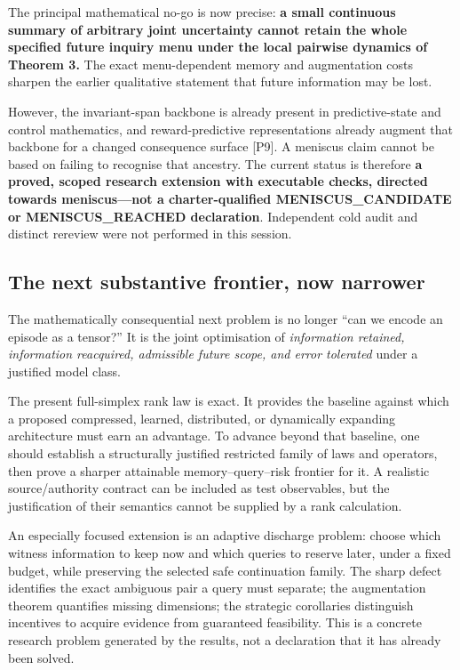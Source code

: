 \documentclass[11pt,a4paper]{article}
\begin{document}
The principal mathematical no-go is now precise: \textbf{a small
continuous summary of arbitrary joint uncertainty cannot retain the
whole specified future inquiry menu under the local pairwise dynamics of
Theorem 3.} The exact menu-dependent memory and augmentation costs
sharpen the earlier qualitative statement that future information may be
lost.

However, the invariant-span backbone is already present in
predictive-state and control mathematics, and reward-predictive
representations already augment that backbone for a changed consequence
surface {[}P9{]}. A meniscus claim cannot be based on failing to
recognise that ancestry. The current status is therefore \textbf{a
proved, scoped research extension with executable checks, directed
towards meniscus---not a charter-qualified MENISCUS\_CANDIDATE or
MENISCUS\_REACHED declaration}. Independent cold audit and distinct
rereview were not performed in this session.

\subsection{The next substantive frontier, now
narrower}\label{the-next-substantive-frontier-now-narrower}

The mathematically consequential next problem is no longer ``can we
encode an episode as a tensor?'' It is the joint optimisation of
\emph{information retained, information reacquired, admissible future
scope, and error tolerated} under a justified model class.

The present full-simplex rank law is exact. It provides the baseline
against which a proposed compressed, learned, distributed, or
dynamically expanding architecture must earn an advantage. To advance
beyond that baseline, one should establish a structurally justified
restricted family of laws and operators, then prove a sharper attainable
memory--query--risk frontier for it. A realistic source/authority
contract can be included as test observables, but the justification of
their semantics cannot be supplied by a rank calculation.

An especially focused extension is an adaptive discharge problem: choose
which witness information to keep now and which queries to reserve
later, under a fixed budget, while preserving the selected safe
continuation family. The sharp defect identifies the exact ambiguous
pair a query must separate; the augmentation theorem quantifies missing
dimensions; the strategic corollaries distinguish incentives to acquire
evidence from guaranteed feasibility. This is a concrete research
problem generated by the results, not a declaration that it has already
been solved.
\end{document}
